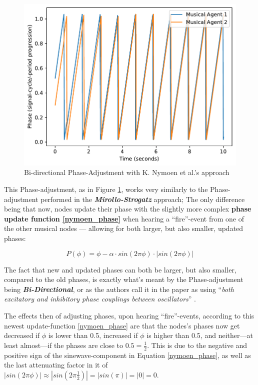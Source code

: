 			\begin{figure}[h]
				\centering
				\includegraphics[width=0.9\linewidth]{Assets/Figures/NymoenPhaseAdjustment.pdf}
				\caption{Bi-directional Phase-Adjustment with K. Nymoen et al.'s approach}
				\label{fig:nymoen_phase}
			\end{figure}
			
			This Phase-adjustment, as in Figure \ref{fig:nymoen_phase}, works very similarly to the Phase-adjustment performed in the \textbf{\textit{Mirollo-Strogatz}} approach; The only difference being that now, nodes update their phase with the slightly more complex \textbf{phase update function \eqref{nymoen_phase}} when hearing a ``fire''-event from one of the other musical nodes — allowing for both larger, but also smaller, updated phases:
			
			\begin{equation}\label{nymoen_phase}
			P(\phi) = \phi - \alpha \cdot sin(2\pi\phi) \cdot | sin(2\pi\phi) |
			\end{equation}
			
			The fact that new and updated phases can both be larger, but also smaller, compared to the old phases, is exactly what's meant by the Phase-adjustment being \textbf{\textit{Bi-Directional}}, or as the authors call it in the paper as using ``\textit{both excitatory and inhibitory phase couplings between oscillators}'' \cite{nymoen_synch}.
			
			The effects then of adjusting phases, upon hearing ``fire''-events, according to this newest update-function \eqref{nymoen_phase} are that the nodes's phases now get decreased if $\phi$ is lower than 0.5, increased if $\phi$ is higher than 0.5, and neither—at least almost—if the phases are close to $0.5 = \frac{1}{2}$. This is due to the negative and positive sign of the sinewave-component in Equation \eqref{nymoen_phase}, as well as the last attenuating factor in it of $| sin(2\pi\phi) | \approx | sin(2\pi \frac{1}{2}) | = | sin(\pi) | = | 0 | = 0.$
		
